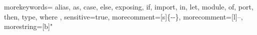 {
  morekeywords={
    alias,
    as,
    case,
    else,
    exposing,
    if,
    import,
    in,
    let,
    module,
    of,
    port,
    then,
    type,
    where
  },
  sensitive=true, %
  morecomment=[s]{\{-}{-\}}, %
  morecomment=[l]{--},
  morestring=[b]" %
}


\usepackage{color}

